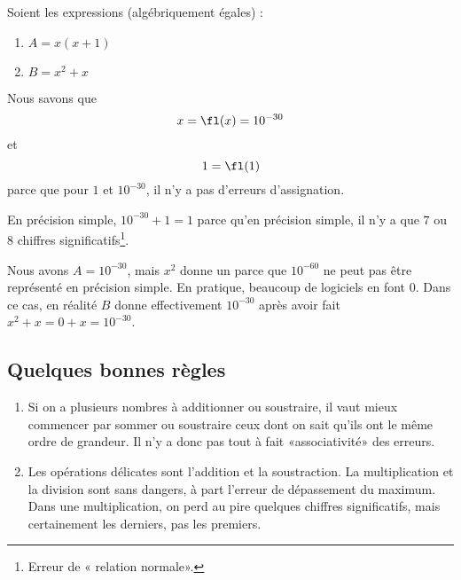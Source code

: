 \begin{example}
	Soient les expressions (algébriquement égales) :
	\begin{enumerate}
		\item
		      \(A= x(x+1)\)
		\item
		      \(B= x^2+x\)
	\end{enumerate}
	Nous savons que
	\begin{equation}
		x=\fl(x)=10^{-30}
	\end{equation}
	et
	\begin{equation}
		1=\fl(1)
	\end{equation}
	parce que pour \( 1\) et \( 10^{-30}\), il n'y a pas d'erreurs d'assignation.

	En précision simple, \( 10^{-30}+1=1\) parce qu'en précision simple, il n'y a que \( 7\) ou \( 8\) chiffres significatifs\footnote{Erreur de « relation normale».}.

	Nous avons \( A=10^{-30}\), mais \( x^2\) donne un  parce que \( 10^{-60}\) ne peut pas être représenté en précision simple. En pratique, beaucoup de logiciels en font \( 0\). Dans ce cas, en réalité \( B\) donne effectivement \( 10^{-30}\) après avoir fait \( x^2+x=0+x=10^{-30}\).
\end{example}

\subsection{Quelques bonnes règles}

\begin{enumerate}
	\item
	      Si on a plusieurs nombres à additionner ou soustraire, il vaut mieux commencer par sommer ou soustraire ceux dont on sait qu'ils ont le même ordre de grandeur. Il n'y a donc pas tout à fait «associativité» des erreurs.
	\item
	      Les opérations délicates sont l'addition et la soustraction. La multiplication et la division sont sans dangers, à part l'erreur de dépassement du maximum. Dans une multiplication, on perd au pire quelques chiffres significatifs, mais certainement les derniers, pas les premiers.
\end{enumerate}

